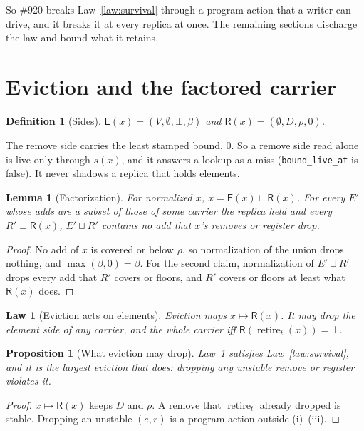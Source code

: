 \documentclass[journal]{IEEEtran}
\newtheorem{definition}{Definition}
\newtheorem{lemma}{Lemma}
\newtheorem{law}{Law}
\newtheorem{proposition}{Proposition}
\newcommand{\El}{\mathsf{E}}
\newcommand{\Rm}{\mathsf{R}}
\newcommand{\ret}{\operatorname{retire}}
\newcommand{\issue}[1]{\#{#1}}
\begin{document}
So \issue{920} breaks Law~\ref{law:survival} through a program action that a writer can
drive, and it breaks it at every replica at once.  The remaining sections discharge the law
and bound what it retains.

\section{Eviction and the factored carrier}\label{sec:evict}

\begin{definition}[Sides]\label{def:sides}
$\El(x)=(V,\emptyset,\bot,\beta)$ and $\Rm(x)=(\emptyset,D,\rho,0)$.
\end{definition}

The remove side carries the least stamped bound, $0$.  So a remove side read alone is live
only through $s(x)$, and it answers a lookup as a miss
(\texttt{bound\_live\_at} is false).  It never shadows a replica that holds elements.

\begin{lemma}[Factorization]\label{lem:factor}
For normalized $x$, $x=\El(x)\sqcup\Rm(x)$.  For every $E'$ whose adds are a subset of those
of some carrier the replica held and every $R'\sqsupseteq\Rm(x)$, $E'\sqcup R'$ contains no
add that $x$'s removes or register drop.
\end{lemma}
\begin{proof}
No add of $x$ is covered or below $\rho$, so normalization of the union drops nothing, and
$\max(\beta,0)=\beta$.  For the second claim, normalization of $E'\sqcup R'$ drops every add
that $R'$ covers or floors, and $R'$ covers or floors at least what $\Rm(x)$ does.
\end{proof}

\begin{law}[Eviction acts on elements]\label{law:evict}
Eviction maps $x\mapsto\Rm(x)$.  It may drop the element side of any carrier, and the whole
carrier iff $\Rm(\ret_t(x))=\bot$.
\end{law}

\begin{proposition}[What eviction may drop]\label{prop:maydrop}
Law~\ref{law:evict} satisfies Law~\ref{law:survival}, and it is the largest eviction that
does: dropping any unstable remove or register violates it.
\end{proposition}
\begin{proof}
$x\mapsto\Rm(x)$ keeps $D$ and $\rho$.  A remove that $\ret_t$ already dropped is stable.
Dropping an unstable $(e,r)$ is a program action outside (i)--(iii).
\end{proof}
\end{document}
